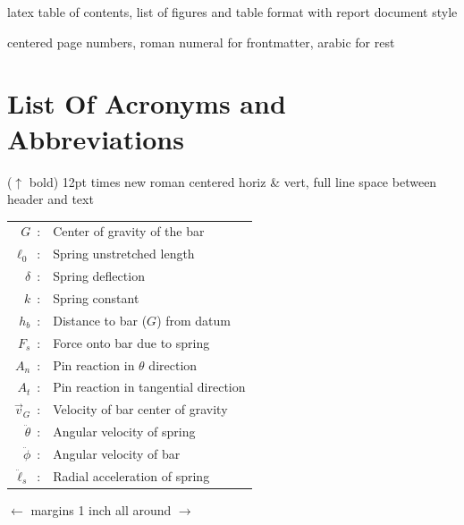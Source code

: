 \documentclass[12pt]{report}
\begin{document}
\normalem

\begin{abstract}
\color{red} ($\uparrow$ bold) 12pt times new roman centered horiz \& vert, full line space between header and text \color{black}
\blindtext
\vfill \begin{center} \color{red} no page number \color{black} \end{center}
\end{abstract}
{\tableofcontents\let\clearpage\relax\listoffigures\let\clearpage\relax\listoftables}
\vspace{2ex}

\color{red} latex table of contents, list of figures and table format with report document style\color{black}
\vfill
\begin{center}
\color{red} centered page numbers, roman numeral for frontmatter, arabic for rest\color{black}
\end{center}
\clearpage
\newpage

\section*{List Of Acronyms and Abbreviations}
\color{red} ($\uparrow$ bold) 12pt times new roman centered horiz \& vert, full line space between header and text \color{black}

\begin{tabular}{rl}
  $G$~:&Center of gravity of the bar \\
  $\ell_0$~:& Spring unstretched length  \\
  $\delta$~:& Spring deflection \\
  $k$~:& Spring constant \\
  $h_{b}$~:& Distance to bar ($G$) from datum \\
  $F_s$~:& Force onto bar due to spring\\
  $A_{n}$~:& Pin reaction in $\theta$ direction\\
  $A_{t}$~:& Pin reaction in tangential direction \\
  $\vec{v}_G$~:& Velocity of bar center of gravity\\
  $\ddot{\theta}$~:& Angular velocity of spring \\
  $\ddot{\phi}$~:& Angular velocity of bar\\
  $\ddot{\ell}_s$~:& Radial acceleration of spring \\
\end{tabular}

\vfill
\color{red}$\leftarrow$ \hfill margins 1 inch all around $\rightarrow$ \color{black}
\vfill\null
\end{document}
